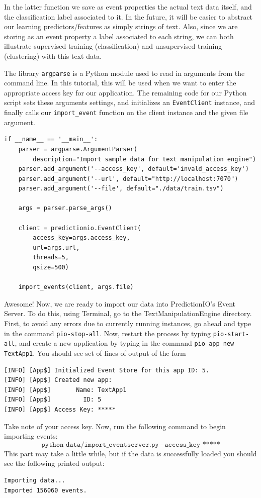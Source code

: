 \documentclass[a4paper,12pt]{article}
\renewcommand{\tt}[1]{\texttt{#1}}
\newcommand{\3}{\left}
\newcommand{\4}{\right}
\renewcommand{\-}[1]{{}^{-#1}}
\begin{document}
In the latter function we save as event properties the actual text data itself, and the classification label associated to it. In the future, it will be easier to abstract our learning predictors/features as simply strings of text. Also, since we are storing as an event property a label associated to each string, we can both illustrate supervised training (classification) and unsupervised training (clustering) with this text data.

\break

The library \tt{argparse} is a Python module used to read in arguments from the command line. In this tutorial, this will be used when we want to enter the appropriate access key for our application. The remaining code for our Python script sets these arguments settings, and initializes an \tt{EventClient} instance, and finally calls our \tt{import\_event} function on the client instance and the given file argument.

\begin{verbatim}
if __name__ == '__main__':
    parser = argparse.ArgumentParser(
        description="Import sample data for text manipulation engine")
    parser.add_argument('--access_key', default='invald_access_key')
    parser.add_argument('--url', default="http://localhost:7070")
    parser.add_argument('--file', default="./data/train.tsv")

    args = parser.parse_args()

    client = predictionio.EventClient(
        access_key=args.access_key,
        url=args.url,
        threads=5,
        qsize=500)

    import_events(client, args.file)
\end{verbatim}

Awesome! Now, we are ready to import our data into PredictionIO's Event Server. To do this, using Terminal, go to the TextManipulationEngine directory. First, to avoid any errors due to currently running instances, go ahead and type in the command \tt{pio-stop-all}. Now, restart the process by typing \tt{pio-start-all}, and create a new application by typing in the command \tt{pio app new TextApp1}. You should see set of lines of output of the form
\begin{verbatim}
[INFO] [App$] Initialized Event Store for this app ID: 5.
[INFO] [App$] Created new app:
[INFO] [App$]       Name: TextApp1
[INFO] [App$]         ID: 5
[INFO] [App$] Access Key: *****
\end{verbatim}
Take note of your access key. Now, run the following command to begin importing events:
$$
\tt{python data/import\_eventserver.py --access\_key *****}
$$
This part may take a little while, but if the data is successfully loaded you should see the following printed output:
\begin{verbatim}
Importing data...
Imported 156060 events.
\end{verbatim}
\end{document}
